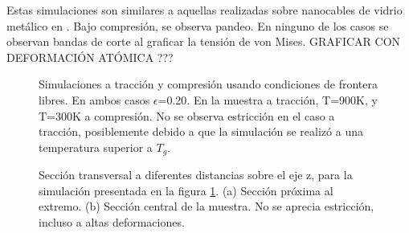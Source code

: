 Estas simulaciones son similares a aquellas realizadas sobre nanocables de vidrio metálico en \cite{xiao12}. Bajo compresión, se observa pandeo. En ninguno de los casos se observan bandas de corte al graficar la tensión de von Mises. GRAFICAR CON DEFORMACIÓN ATÓMICA ???


\begin{figure}[htp]
\centering
{}
\caption[Simulaciones a tracción y compresión usando condiciones de frontera libres.]{Simulaciones a tracción y compresión usando condiciones de frontera libres. En ambos casos $\epsilon$=0.20. En la muestra a tracción, T=900K, y T=300K a compresión. No se observa estricción en el caso a tracción, posiblemente debido a que la simulación se realizó a una temperatura superior a $T_g$.}
\label{C3:fg:libres}
\end{figure}

\begin{figure}[htp]
\centering
{}
\caption[Sección transversal a diferentes distancias sobre el eje z, para la simulación presentada en la figura \ref{C3:fg:libres}]{Sección transversal a diferentes distancias sobre el eje z, para la simulación presentada en la figura \ref{C3:fg:libres}. (a) Sección próxima al extremo. (b) Sección central de la muestra. No se aprecia estricción, incluso a altas deformaciones.}
\label{C3:fg:cross}
\end{figure}





